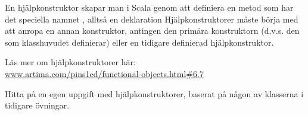 En hjälpkonstruktor skapar man i Scala genom att definiera en metod som har det speciella namnet , alltså en deklaration  Hjälpkonstruktorer måste börja med att anropa en annan konstruktor, antingen den primära konstruktorn (d.v.s. den som klasshuvudet definierar) eller en tidigare definierad  hjälpkonstruktor.

\Subtask Läs mer om hjälpkonstruktorer här: \\ \href{http://www.artima.com/pins1ed/functional-objects.html#6.7}{www.artima.com/pins1ed/functional-objects.html\#6.7}

\Subtask Hitta på en egen uppgift med hjälpkonstruktorer, baserat på någon av klasserna i tidigare övningar.



\QUESTEND
